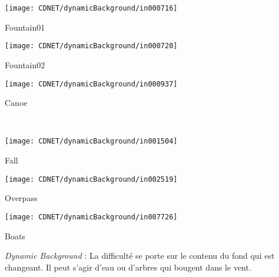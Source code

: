 	\begin{figureth}
		\begin{subfigureth}{0.24\textwidth}
			\texttt{[image: CDNET/dynamicBackground/in000716]}\caption{Fountain01}	
		\end{subfigureth}
		\begin{subfigureth}{0.24\textwidth}
			\texttt{[image: CDNET/dynamicBackground/in000720]}\caption{Fountain02}	
		\end{subfigureth}
		\begin{subfigureth}{0.24\textwidth}
			\texttt{[image: CDNET/dynamicBackground/in000937]}\caption{Canoe}	
		\end{subfigureth}\\
		\begin{subfigureth}{0.24\textwidth}
			\texttt{[image: CDNET/dynamicBackground/in001504]}\caption{Fall}	
		\end{subfigureth}
		\begin{subfigureth}{0.24\textwidth}
			\texttt{[image: CDNET/dynamicBackground/in002519]}\caption{Overpass}	
		\end{subfigureth}
		\begin{subfigureth}{0.24\textwidth}
			\texttt{[image: CDNET/dynamicBackground/in007726]}\caption{Boats}	
		\end{subfigureth}
		\caption[Categorie Dynamic Background]{\textit{Dynamic Background} : La difficulté se porte sur le contenu du fond qui est changeant. Il peut s'agir d'eau ou d'arbres qui bougent dans le vent.}\label{fig:cdnet:dynamic}
	\end{figureth}

